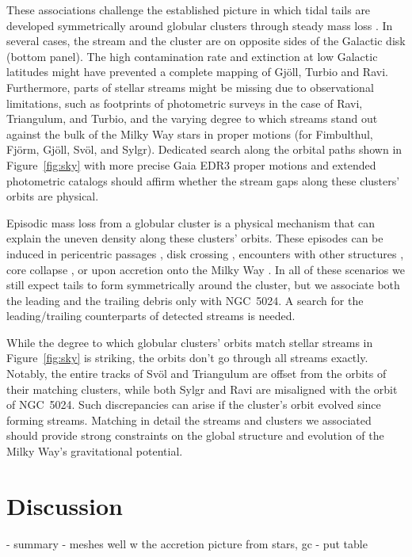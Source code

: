 \documentclass[twocolumn]{aastex63}
\begin{document}
These associations challenge the established picture in which tidal tails are developed symmetrically around globular clusters through steady mass loss \citep[e.g.,][]{kuepper2010}.
In several cases, the stream and the cluster are on opposite sides of the Galactic disk (bottom panel).
The high contamination rate and extinction at low Galactic latitudes might have prevented a complete mapping of Gj\" oll, Turbio and Ravi.
Furthermore, parts of stellar streams might be missing due to observational limitations, such as footprints of photometric surveys in the case of Ravi, Triangulum, and Turbio, and the varying degree to which streams stand out against the bulk of the Milky Way stars in proper motions (for Fimbulthul, Fj\" orm, Gj\" oll, Sv\" ol, and Sylgr).
Dedicated search along the orbital paths shown in Figure~\ref{fig:sky} with more precise Gaia EDR3 proper motions \citep{edr3} and extended photometric catalogs \citep{decals} should affirm whether the stream gaps along these clusters' orbits are physical.

Episodic mass loss from a globular cluster is a physical mechanism that can explain the uneven density along these clusters' orbits.
These episodes can be induced in pericentric passages \citep{general_stripping_ref}, disk crossing \citep{dehnen_pal5}, encounters with other structures \citep{?}, core collapse \citep{?}, or upon accretion onto the Milky Way \citep{?}.
In all of these scenarios we still expect tails to form symmetrically around the cluster, but we associate both the leading and the trailing debris only with NGC~5024.
A search for the leading/trailing counterparts of detected streams is needed.

While the degree to which globular clusters' orbits match stellar streams in Figure~\ref{fig:sky} is striking, the orbits don't go through all streams exactly.
Notably, the entire tracks of Sv\" ol and Triangulum are offset from the orbits of their matching clusters, while both Sylgr and Ravi are misaligned with the orbit of NGC~5024.
Such discrepancies can arise if the cluster's orbit evolved since forming streams.
Matching in detail the streams and clusters we associated should provide strong constraints on the global structure and evolution of the Milky Way's gravitational potential.



\section{Discussion}
\label{sec:discussion}
- summary
- meshes well w the accretion picture from stars, gc
- put table
\end{document}
